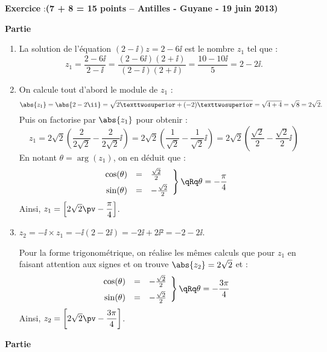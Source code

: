 \documentclass[12pt,french]{article}
\newcounter{exoc}
\newenvironment{exoc}[1]{%
  \refstepcounter{exoc}\textbf{Exercice \theexoc} :\hfill {\footnotesize\textbf{(#1)}}\par
  \medskip}%
{\medskip}
\begin{document}
\begin{exoc}{7 + 8 = 15 points -- Antilles - Guyane - 19 juin 2013}

\textbf{Partie} \medskip

\begin{enumerate}
	\item La solution de l'équation $(2-\ii)z = 2 - 6\ii$ est le nombre $z_1$ tel que :
	\[z_1 = \dfrac{2 - 6\ii}{2-\ii} = \dfrac{(2-6\ii)(2+\ii)}{(2-\ii)(2+\ii)} = \dfrac{10 - 10\ii}{5} = 2 - 2\ii.\]
	
	\item On calcule tout d'abord le module de $z_1$ :
	\[\abs{z_1} = \abs{2 - 2\ii} = \sqrt{2² + (-2)²} = \sqrt{4 + 4} = \sqrt 8 = 2\sqrt 2.\]
	Puis on factorise par $\abs{z_1}$ pour obtenir :
	\[z_1 = 2\sqrt2\left(\dfrac{2}{2\sqrt2} - \dfrac{2}{2\sqrt2}\ii\right)
		   = 2\sqrt2\left(\dfrac{1}{\sqrt2} - \dfrac{1}{\sqrt2}\ii\right)
		   = 2\sqrt2\left(\dfrac{\sqrt 2}{2} - \dfrac{\sqrt 2}{2}\ii\right)\]
	En notant $\theta = \arg(z_1)$, on en déduit que :
	\[\left.\begin{array}{rcl}
	  	\cos(\theta)& = &\frac{\sqrt2}{2}\\[5pt]
	  	\sin(\theta) & = & -\frac{\sqrt2}{2}
	  \end{array}\right\} \qRq \theta = -\dfrac\pi4\]
	  Ainsi, $z_1 = \left[2\sqrt 2 \pv -\dfrac\pi 4\right]$.

	\item $z_2 = -\ii\times z_1 = -\ii (2 - 2\ii) = -2\ii + 2 \ii² = -2 - 2\ii$.
	
	Pour la forme trigonométrique, on réalise les mêmes calculs que pour $z_1$ en faisant attention aux signes et on trouve $\abs{z_2} = 2\sqrt 2$ et :
	\[\left.\begin{array}{rcl}
		\cos(\theta)& = &-\frac{\sqrt2}{2}\\[5pt]
		\sin(\theta) & = & -\frac{\sqrt2}{2}
	  \end{array}\right\} \qRq \theta = -\dfrac{3\pi}{4}\]
	  Ainsi, $z_2 = \left[2\sqrt 2 \pv -\dfrac{3\pi}{4}\right]$.
\end{enumerate}\medskip

\textbf{Partie} \medskip


\end{exoc}
\end{document}
